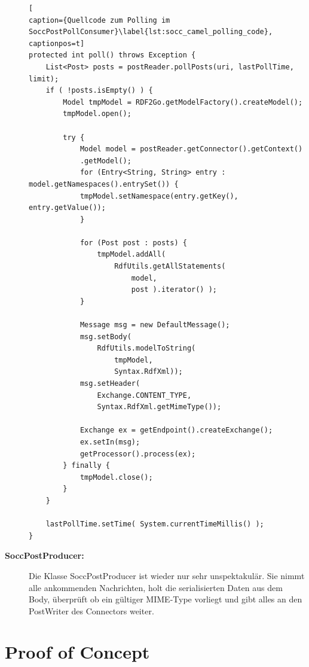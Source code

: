 \begin{description}
\begin{lstlisting}[
caption={Quellcode zum Polling im  SoccPostPollConsumer}\label{lst:socc_camel_polling_code},
captionpos=t]
protected int poll() throws Exception {
    List<Post> posts = postReader.pollPosts(uri, lastPollTime, limit);
    if ( !posts.isEmpty() ) {
        Model tmpModel = RDF2Go.getModelFactory().createModel();
        tmpModel.open();

        try {
            Model model = postReader.getConnector().getContext()
            .getModel();
            for (Entry<String, String> entry : model.getNamespaces().entrySet()) {
            tmpModel.setNamespace(entry.getKey(), entry.getValue());
            }

            for (Post post : posts) {
                tmpModel.addAll( 
                    RdfUtils.getAllStatements( 
                        model, 
                        post ).iterator() );
            }

            Message msg = new DefaultMessage();
            msg.setBody( 
                RdfUtils.modelToString(
                    tmpModel, 
                    Syntax.RdfXml));
            msg.setHeader(
                Exchange.CONTENT_TYPE, 
                Syntax.RdfXml.getMimeType());

            Exchange ex = getEndpoint().createExchange();
            ex.setIn(msg);
            getProcessor().process(ex);
        } finally {
            tmpModel.close();
        }
    }

    lastPollTime.setTime( System.currentTimeMillis() );
}
\end{lstlisting}

    \item[\textbf{SoccPostProducer:}] Die Klasse SoccPostProducer ist wieder nur sehr unspektakulär. Sie nimmt alle ankommenden Nachrichten, holt die serialisierten Daten aus dem Body, überprüft ob ein gültiger MIME-Type vorliegt und gibt alles an den PostWriter des Connectors weiter. 
    
\end{description}



\section{Proof of Concept} %
\label{sec:proof_of_concept}

